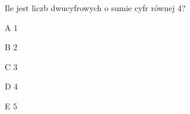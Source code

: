 \begin{tresc}
Ile jest liczb dwucyfrowych o sumie cyfr równej 4?
\end{tresc}
\begin{wariant}{A} 1 \end{wariant}
\begin{wariant}{B} 2 \end{wariant}
\begin{wariant}{C} 3 \end{wariant}
\begin{wariant}{D} 4 \end{wariant}
\begin{wariant}{E} 5 \end{wariant}
